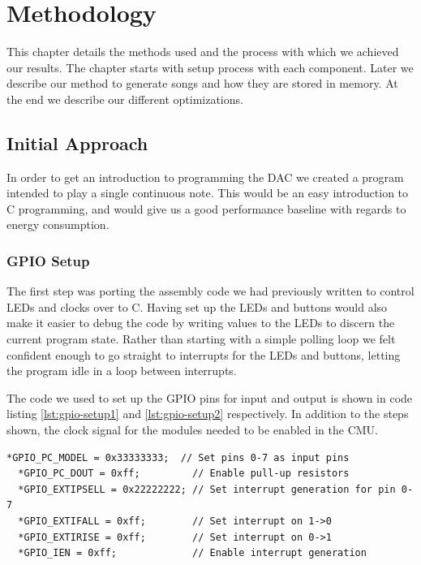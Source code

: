 \chapter{Methodology}
This chapter details the methods used and the process with which we achieved our results. The chapter starts with setup process with each component. Later we describe our method to generate songs and how they are stored in memory. At the end we describe our different optimizations.

\section{Initial Approach}
In order to get an introduction to programming the DAC we created a program intended to play a single continuous note. This would be an easy introduction to C programming, and would give us a good performance baseline with regards to energy consumption.

\subsection{GPIO Setup} 
The first step was porting the assembly code we had previously written to control LEDs and clocks over to C. Having set up the LEDs and buttons would also make it easier to debug the code by writing values to the LEDs to discern the current program state. Rather than starting with a simple polling loop we felt confident enough to go straight to interrupts for the LEDs and buttons, letting the program idle in a loop between interrupts.

The code we used to set up the GPIO pins for input and output is shown in code listing \ref{lst:gpio-setup1} and \ref{lst:gpio-setup2} respectively. In addition to the steps shown, the clock signal for the modules needed to be enabled in the CMU. \\

\noindent\begin{minipage}[pos=c,contentpos=c]{\textwidth}
  \begin{lstlisting}[caption=Setting GPIO pins 0-7 as input,label={lst:gpio-setup1}]
  *GPIO_PC_MODEL = 0x33333333;  // Set pins 0-7 as input pins
  *GPIO_PC_DOUT = 0xff;         // Enable pull-up resistors
  *GPIO_EXTIPSELL = 0x22222222; // Set interrupt generation for pin 0-7
  *GPIO_EXTIFALL = 0xff;        // Set interrupt on 1->0
  *GPIO_EXTIRISE = 0xff;        // Set interrupt on 0->1
  *GPIO_IEN = 0xff;             // Enable interrupt generation
  \end{lstlisting}
\end{minipage}

